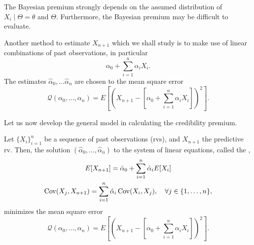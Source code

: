 \documentclass[notoc,notitlepage]{tufte-book}
\begin{document}
The Bayesian premium strongly depends on the assumed distribution of $X_i \mid
\Theta = \theta$ and $\Theta$. Furthermore, the Bayesian premium may be
difficult to evaluate.

Another method to estimate $X_{n+1}$ which we shall study is to make use of
linear combinations of past observations, in particular
\begin{equation*}
  \alpha_0 + \sum_{i=1}^{n} \alpha_i X_i.
\end{equation*}
The estimates $\hat{\alpha}_0, \ldots \hat{\alpha}_n$ are chosen to
 the mean square error
\begin{equation*}
  \mathcal{Q}(\alpha_0, \ldots, \alpha_n) = E \left[ \left( X_{n+1} - \left[
  \alpha_0 + \sum_{i=1}^{n} \alpha_i X_i \right] \right)^2 \right].
\end{equation*}

Let us now develop the general model in calculating the credibility premium.


\begin{thm}\label{thm:general_model_for_credibility_premium}
  Let $\{ X_i \}_{i=1}^n$ be a sequence of past observations (rvs), and
  $X_{n+1}$ the predictive rv. Then, the solution $(\hat{\alpha}_0, \ldots,
  \hat{\alpha}_n)$ to the system of linear equations, called the ,
  \begin{gather*}
    E[X_{n+1}] = \hat{\alpha}_0  + \sum_{i=1}^{n} \hat{\alpha}_i E[X_i] \\
    \operatorname{Cov}(X_j, X_{n+1}) = \sum_{i=1}^{n} \hat{\alpha}_i \operatorname{Cov}(X_i, X_j), \quad
    \forall j \in \{ 1, \ldots, n \},
  \end{gather*}
  minimizes the mean square error
  \begin{equation*}
    \mathcal{Q}(\alpha_0, \ldots, \alpha_n) = E \left[ \left( X_{n+1} - \left[
    \alpha_0 + \sum_{i=1}^{n} \alpha_i X_i \right] \right)^2 \right].
  \end{equation*}
\end{thm}
\end{document}
